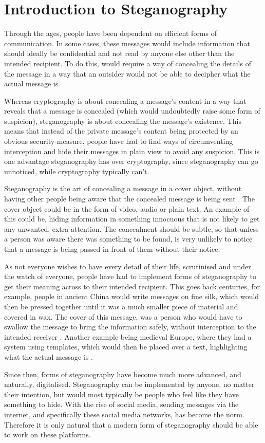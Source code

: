 \section{Introduction to Steganography}
Through the ages, people have been dependent on efficient forms of communication. In some cases, these messages would include information that should ideally be confidential and not read by anyone else other than the intended recipient. To do this, would require a way of concealing the details of the message in a way that an outsider would not be able to decipher what the actual message is.

Whereas cryptography is about concealing a message's content in a way that reveals that a message is concealed (which would undoubtedly raise some form of suspicion), steganography is about concealing the message's existence. This means that instead of the private message's content being protected by an obvious security-measure, people have had to find ways of circumventing interception and hide their messages in plain view to avoid any suspicion. This is one advantage steganography has over cryptography, since steganography can go unnoticed, while cryptography typically can't. 

Steganography is the art of concealing a message in a cover object, without having other people being aware that the concealed message is being sent \citep{Anderson1998}. The cover object could be in the form of video, audio or plain text. An example of this could be, hiding information in something innocuous that is not likely to get any unwanted, extra attention. The concealment should be subtle, so that unless a person was aware there was something to be found, is very unlikely to notice that a message is being passed in front of them without their notice.

As not everyone wishes to have every detail of their life, scrutinised and under the watch of everyone, people have had to implement forms of steganography to get their meaning across to their intended recipient. This goes back centuries, for example, people in ancient China would write messages on fine silk, which would then be pressed together until it was a much smaller piece of material and covered in wax. The cover of this message, was a person who would have to swallow the message to bring the information safely, without interception to the intended receiver \citep{Singh2001}. Another example being medieval Europe, where they had a system using templates, which would then be placed over a text, highlighting what the actual message is \citep{Anderson1998}.

Since then, forms of steganography have become much more advanced, and naturally, digitalised. Steganography can be implemented by anyone, no matter their intention, but would most typically be people who feel like they have something to hide. With the rise of social media, sending messages via the internet, and specifically these social media networks, has become the norm. Therefore it is only natural that a modern form of steganography should be able to work on these platforms. 
